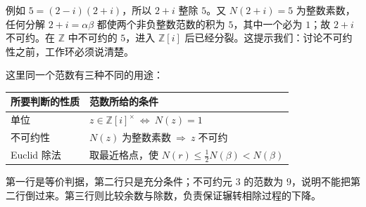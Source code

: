 例如 \(5=(2-i)(2+i)\)，所以 \(2+i\) 整除 \(5\)。又 \(N(2+i)=5\) 为整数素数，任何分解 \(2+i=\alpha\beta\) 都使两个非负整数范数的积为 \(5\)，其中一个必为 \(1\)；故 \(2+i\) 不可约。在 \(\mathbb Z\) 中不可约的 \(5\)，进入 \(\mathbb Z[i]\) 后已经分裂。这提示我们：讨论不可约性之前，工作环必须说清楚。

\ProseParagraphBreak
这里同一个范数有三种不同的用途：
\begin{center}
	\begin{tabular}{ll}
		\toprule
		所要判断的性质 & 范数所给的条件 \\
		\midrule
		单位 & \(z\in\mathbb Z[i]^\times\ \Longleftrightarrow\ N(z)=1\) \\
		不可约性 & \(N(z)\;\text{为整数素数}\ \Longrightarrow\ z\;\text{不可约}\) \\
		Euclid 除法 & 取最近格点，使 \(N(r)\leq\tfrac12N(\beta)<N(\beta)\) \\
		\bottomrule
	\end{tabular}
\end{center}
第一行是等价判据，第二行只是充分条件；不可约元 \(3\) 的范数为 \(9\)，说明不能把第二行倒过来。第三行则比较余数与除数，负责保证辗转相除过程的下降。
